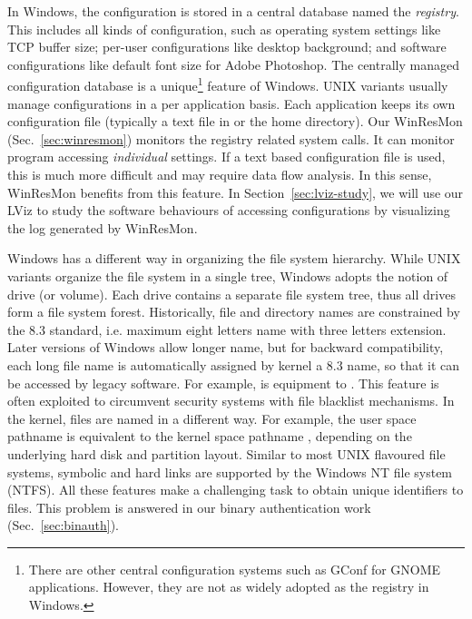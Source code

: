 In Windows, the configuration is stored in a central database named the
{\em registry}.
This includes all kinds of configuration, such as
operating system settings like TCP buffer size;
per-user configurations like desktop background;
and software configurations like default font size
for Adobe Photoshop.
The centrally managed configuration database is a unique\footnote{
There are other central configuration systems such as
GConf for GNOME applications.
However, they are not as widely adopted as the registry in Windows.
} feature of Windows.
UNIX variants usually manage configurations in a per application basis.
Each application keeps its own configuration file (typically a
text file in  or the home directory).
Our WinResMon (Sec.~\ref{sec:winresmon}) monitors the registry
related system calls.
It can monitor program accessing {\em individual} settings.
If a text based configuration file is used, this is much more difficult
and may require data flow analysis.
In this sense, WinResMon benefits from this feature.
In Section~\ref{sec:lviz-study}, we will use our LViz to study the
software behaviours of accessing configurations by visualizing the
log generated by WinResMon.

Windows has a different way in organizing the file system hierarchy.
While UNIX variants organize the file system in a single tree,
Windows adopts the notion of drive (or volume).
Each drive contains a separate file system tree, thus all drives
form a file system forest.
Historically, file and directory names are constrained by the 8.3
standard,
i.e. maximum eight letters name with three letters extension.
Later versions of Windows allow longer name, but for backward
compatibility, each long file name is automatically assigned by kernel a
8.3 name, so that it can be accessed by legacy software.
For example,  is equipment to .
This feature is often exploited to circumvent security systems with
file blacklist mechanisms.
In the kernel, files are named in a different way.
For example, the user space pathname 
is equivalent to the kernel space pathname
,
depending on the underlying hard disk and partition layout.
Similar to most UNIX flavoured file systems, symbolic and hard links
are supported by the Windows NT file system (NTFS).
All these features make a challenging task to obtain unique identifiers to files.
This problem is answered in our binary authentication work (Sec.~\ref{sec:binauth}).

